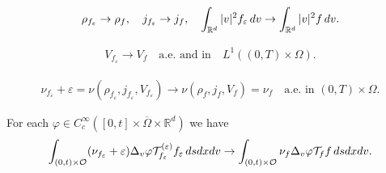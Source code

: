 \documentclass[10pt,a4paper]{amsart}
\newcommand{\R}{\mathbb{R}}
\newcommand{\calO}{\mathcal O}
\newcommand{\calT}{\mathcal T}
\newcommand{\ds}{\textnormal{d}s}
\newcommand{\dv}{\textnormal{d}v}
\newcommand{\dx}{\textnormal{d}x}
\newcommand{\intr}{\int_{\R^d}}
\newcommand{\ve}{\varepsilon}
\begin{document}
    \begin{equation} \label{eq: MAC convergence}
        \rho_{f_\ve} \to \rho_f, \quad j_{f_\ve} \to j_f, \quad  \intr |v|^2 f_\ve \,\dv \to \intr |v|^2 f \,\dv.
    \end{equation}

    \begin{align}\label{eq: V convergence}
        V_{f_\ve} \to V_f \quad \text{a.e. and in}\quad L^1((0,T)\times\Omega).
    \end{align}

    \begin{align}\label{eq: NU convergence}
        \nu_{f_\ve} + \ve = \nu(\rho_{f_\ve}, j_{f_\ve}, V_{f_\ve}) \to \nu(\rho_f, j_f, V_f) = \nu_f  \quad \text{a.e. in }(0,T)\times \Omega.
    \end{align}

\begin{lemma}
For each $\varphi\in C_c^\infty([0,t]\times \overline{\Omega}\times \R^d)$ we have
\begin{align}\label{eq: PASS weak form 1}
    \int_{(0,t)\times \calO} (\nu_{f_\ve} + \ve) \Delta_v \varphi \calT_{f_\ve}^{(\ve)} f_\ve \,\ds\dx\dv  \to \int_{(0,t)\times \calO} \nu_{f} \Delta_v \varphi \calT_f f \,\ds\dx\dv.
\end{align}
\end{lemma}
\end{document}
